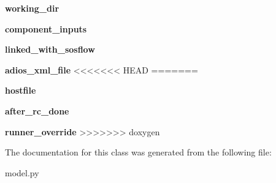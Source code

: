 \begin{DoxyCompactItemize}
{\bfseries working\+\_\+dir}
\item 
\mbox{\label{classcodar_1_1cheetah_1_1model_1_1_run_component_a1d8cb3d579339ac5eba3c0311640b382}} 
{\bfseries component\+\_\+inputs}
\item 
\mbox{\label{classcodar_1_1cheetah_1_1model_1_1_run_component_a70c8417b14f64e93c812d52d63180e1f}} 
{\bfseries linked\+\_\+with\+\_\+sosflow}
\item 
\mbox{\label{classcodar_1_1cheetah_1_1model_1_1_run_component_a2a855ca947ebabda952f8dab7c1fe4a6}} 
{\bfseries adios\+\_\+xml\+\_\+file}
<<<<<<< HEAD
=======
\item 
\mbox{\label{classcodar_1_1cheetah_1_1model_1_1_run_component_abcc514032d8dc3c203db3fea1e0cd94b}} 
{\bfseries hostfile}
\item 
\mbox{\label{classcodar_1_1cheetah_1_1model_1_1_run_component_a0ea6b3921652cd3852a5e2425d9a80ca}} 
{\bfseries after\+\_\+rc\+\_\+done}
\item 
\mbox{\label{classcodar_1_1cheetah_1_1model_1_1_run_component_ac5ca127f98817a9a14ef6d63d9b53d4f}} 
{\bfseries runner\+\_\+override}
>>>>>>> doxygen
\end{DoxyCompactItemize}


The documentation for this class was generated from the following file\+:\begin{DoxyCompactItemize}
\item 
model.\+py\end{DoxyCompactItemize}
